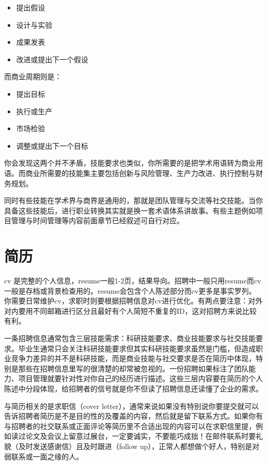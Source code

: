 \documentclass[]{tufte-book}
\providecommand{\tightlist}{%
  \setlength{\itemsep}{0pt}\setlength{\parskip}{0pt}}
\begin{document}
\begin{itemize}
\tightlist
\item
  提出假设
\item
  设计与实验
\item
  成果发表
\item
  改进或提出下一个假设
\end{itemize}

而商业周期则是：

\begin{itemize}
\tightlist
\item
  提出目标
\item
  执行或生产
\item
  市场检验
\item
  调整或提出下一个目标
\end{itemize}

你会发现这两个并不矛盾，技能要求也类似，你所需要的是把学术用语转为商业用语。而商业所需要的技能集主要包括创新与风险管理、生产力改进、执行控制与财务规划。

同时有些技能在学术界与商界是通用的，那就是团队管理与交流等社交技能。当你具备这些技能后，进行职业转换其实就是换一套术语体系讲故事。有些主题例如项目管理与时间管理等内容前面章节已经叙述可自行对应。

\hypertarget{ux7b80ux5386}{%
\section{简历}\label{ux7b80ux5386}}

cv 是完整的个人信息，resume一般1-2页，结果导向。招聘中一般只用resume而cv一般是存档或背景检查用的。resume会包含个人陈述部分而cv更多是事实罗列。你需要日常维护cv，求职时则要根据招聘信息对cv进行优化。有两点要注意：对外对内要用不同邮箱进行区分且最好有个人简短不重复的ID，这对招聘方来说比较有利。

一条招聘信息通常包含三层技能需求：科研技能要求、商业技能要求与社交技能要求。毕业生通常只会关注科研技能要求但其实科研技能要求虽然是门槛，但造成职业竞争力差异的并不是科研技能，而是商业技能与社交要求是否在简历中体现，特别是那些在招聘信息里写的很清楚的却常被忽视的。一份招聘如果标注了团队能力、项目管理就要针对性对你自己的经历进行描述。这些三层内容要在简历的个人陈述中分段体现，给招聘者的信号就是你不但读了招聘信息还读懂了企业的需求。

与简历相关的是求职信（cover letter），通常来说如果没有特别说你要提交就可以告诉招聘者简历是不是目的性的及覆盖的内容，然后就是留下联系方式。如果你有与招聘者的社交联系或正面评论等简历里不合适出现的内容可以在求职信里提，例如读过论文及会议上留意过展台，一定要诚实，不要能巧成拙！在邮件联系时要礼貌（及时发送感谢信）且及时跟进（follow up），正常人都想做个好人，特别是对弱联系或一面之缘的人。
\end{document}

